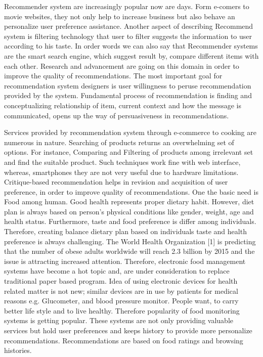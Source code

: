 Recommender system are increasingly popular now are days. Form e-comers to movie websites, they not only help to increase business but also behave an personalize user preference assistance. Another aspect of describing Recommend system is filtering technology that user to filter suggests the information to user according to his taste. In order words we can also say that Recommender systems are the smart search engine, which suggest result by, compare different items with each other. Research and advancement are going on this domain in order to improve the quality of recommendations. \newline 
The most important goal for recommendation system designers is user willingness to peruse recommendation provided by the system. Fundamental process of recommendation is finding and conceptualizing relationship of item, current context and how the message is communicated, opens up the way of persuasiveness in recommendations.\newline

Services provided by recommendation system through e-commerce to cooking are numerous in nature. Searching of products returns an overwhelming set of options. For instance, Comparing and Filtering of products among irrelevant set and find the suitable product. Such techniques work fine with web interface, whereas, smartphones they are not very useful due to hardware limitations. Critique-based recommendation helps in revision and acquisition of user preference, in order to improve quality of recommendations.\newline
One the basic need is Food among human. Good health represents proper dietary habit. However, diet plan is always based on person’s physical conditions like gender, weight, age and health status. Furthermore, taste and food preference is differ among individuals. Therefore, creating balance dietary plan based on individuals taste and health preference is always challenging.\newline
The World Health Organization [1] is predicting that the number of obese adults worldwide will reach 2.3 billion by 2015 and the issue is attracting increased attention. Therefore, electronic food management systems have become a hot topic and, are under consideration to replace traditional paper based program. Idea of using electronic devices for health related matter is not new; similar devices are in use by patients for medical reasons e.g. Glucometer, and blood pressure monitor. People want, to carry better life style and to live healthy. Therefore popularity of food monitoring systems is getting popular.  These systems are not only providing valuable services but hold user preferences and keeps history to provide more personalize recommendations. Recommendations are based on food ratings and browsing histories.\newline

